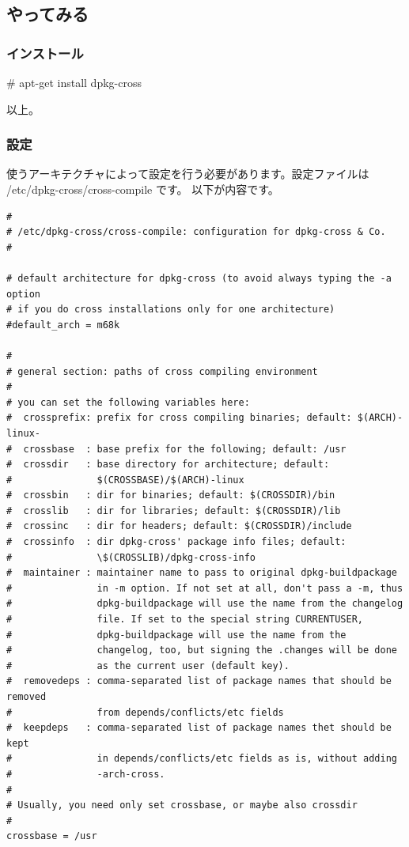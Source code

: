 \documentclass[mingoth,a4paper]{jsarticle}
\begin{document}
\subsection{やってみる}
\subsubsection{インストール}
\# apt-get install dpkg-cross

以上。
\subsubsection{設定}
使うアーキテクチャによって設定を行う必要があります。設定ファイルは /etc/dpkg-cross/cross-compile です。
以下が内容です。
{\small
\begin{verbatim}
#
# /etc/dpkg-cross/cross-compile: configuration for dpkg-cross & Co.
#

# default architecture for dpkg-cross (to avoid always typing the -a option
# if you do cross installations only for one architecture)
#default_arch = m68k

#
# general section: paths of cross compiling environment
#
# you can set the following variables here:
#  crossprefix: prefix for cross compiling binaries; default: $(ARCH)-linux-
#  crossbase  : base prefix for the following; default: /usr
#  crossdir   : base directory for architecture; default:
#               $(CROSSBASE)/$(ARCH)-linux
#  crossbin   : dir for binaries; default: $(CROSSDIR)/bin
#  crosslib   : dir for libraries; default: $(CROSSDIR)/lib
#  crossinc   : dir for headers; default: $(CROSSDIR)/include
#  crossinfo  : dir dpkg-cross' package info files; default:
#               \$(CROSSLIB)/dpkg-cross-info
#  maintainer : maintainer name to pass to original dpkg-buildpackage
#               in -m option. If not set at all, don't pass a -m, thus
#               dpkg-buildpackage will use the name from the changelog
#               file. If set to the special string CURRENTUSER,
#               dpkg-buildpackage will use the name from the
#               changelog, too, but signing the .changes will be done
#               as the current user (default key).
#  removedeps : comma-separated list of package names that should be removed
#               from depends/conflicts/etc fields
#  keepdeps   : comma-separated list of package names thet should be kept
#               in depends/conflicts/etc fields as is, without adding
#               -arch-cross.
#
# Usually, you need only set crossbase, or maybe also crossdir
#
crossbase = /usr


\end{verbatim}}
\end{document}
